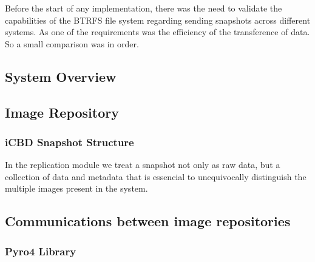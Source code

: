 Before the start of any implementation, there was the need to validate the capabilities of the BTRFS file system regarding sending snapshots across different systems.
As one of the requirements was the efficiency of the transference of data. So a small comparison was in order. 


\subsection{System Overview}
\label{sub:system_overview}

\subsection{Image Repository}
\label{sub:rep_image_repo}

\subsubsection{iCBD Snapshot Structure}
\label{subsub:icbd_snapshot}

In the replication module we treat a snapshot not only as raw data, but a collection of data and metadata that is essencial to unequivocally distinguish the multiple images present in the system. 


\subsection{Communications between image repositories}
\label{sub:rep_rpcs}


\subsubsection{Pyro4 Library}
\label{subsub:rep_pyro4}



